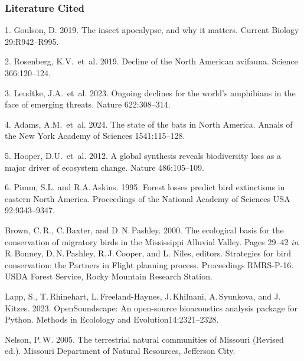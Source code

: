 
\singlespacing\small

\subsubsection*{Literature Cited}

\begin{hangparas}{1.5em}{1}
	
	1. Goulson, D. 2019. The insect apocalypse, and why it matters. Current Biology 29:R942–R995.
	
	2. Rosenberg, K.V.~et~al. 2019. Decline of the North American avifauna. Science 366:120–124.

	3. Leudtke, J.A.~et~al. 2023. Ongoing declines for the world’s amphibians
in the face of emerging threats. Nature 622:308–314. 
	
	4. Adams, A.M.~et~al. 2024. The state of the bats in North America. Annals of the New York Academy of Sciences 1541:115–128. 
	
	5. Hooper, D.U.~et~al. 2012. A global synthesis reveals biodiversity loss as a major	driver of ecosystem change. Nature 486:105–109.
	
	6. Pimm, S.L. and R.A.\,Askins. 1995. Forest losses predict bird extinctions in eastern North America. Proceedings of the National Academy of Sciences USA 92:9343–9347.
	



	Brown, C.\,R., C.\,Baxter, and D.\,N.\,Pashley. 2000. The ecological basis for the conservation of migratory birds in the Mississippi Alluvial Valley. Pages 29–42 \textit{in} R.\,Bonney, D.\,N.\,Pashley, R.\,J.\,Cooper, and L. Niles, editors. Strategies for bird conservation: the Partners in Flight planning process. Proceedings RMRS-P-16. USDA Forest Service, Rocky Mountain Research Station.
	
	
	
	Lapp, S., T.\,Rhinehart, L.\,Freeland-Haynes, J.\,Khilnani, A.\,Syunkova, and J.\,Kitzes. 2023. OpenSoundscape: An open-­source bioacoustics analysis
	package for Python. Methods in Ecolology and Evolution14:2321–2328. 
	
	
	Nelson, P.\,W. 2005. The terrestrial natural communities of Missouri (Revised ed.). Missouri Department of Natural Resources, Jefferson City.
	

\end{hangparas}
